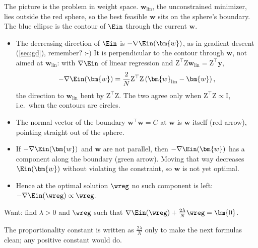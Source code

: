 The picture is the problem in weight space. \(\bm{w}_{\mathrm{lin}}\), the
unconstrained minimizer, lies outside the red sphere, so the best feasible
\(\bm{w}\) sits on the sphere's boundary. The blue ellipse is the contour of
\(\Ein\) through the current \(\bm{w}\).
\begin{itemize}
    \item The decreasing direction of \(\Ein\) is \(-\nabla \Ein(\bm{w})\), as
        in gradient descent (\autoref{sec:gd}), remember? :-)
        It is perpendicular to the contour through \(\bm{w}\), not aimed
        at \(\bm{w}_{\mathrm{lin}}\): with \(\nabla \Ein\) of linear
        regression and \(\mathrm{Z}^\top \mathrm{Z} \bm{w}_{\mathrm{lin}} =
        \mathrm{Z}^\top \bm{y}\),
        \[
            -\nabla \Ein(\bm{w}) = \frac{2}{N} \mathrm{Z}^\top \mathrm{Z}
            \left( \bm{w}_{\mathrm{lin}} - \bm{w} \right) ,
        \]
        the direction to \(\bm{w}_{\mathrm{lin}}\) bent by \(\mathrm{Z}^\top
        \mathrm{Z}\). The two agree only when \(\mathrm{Z}^\top \mathrm{Z}
        \propto \mathrm{I}\), i.e.\ when the contours are circles.
    \item The normal vector of the boundary \(\bm{w}^\top \bm{w} = C\) at
        \(\bm{w}\) is \(\bm{w}\) itself (red arrow), pointing straight out of
        the sphere.
    \item If \(-\nabla \Ein(\bm{w})\) and \(\bm{w}\) are not parallel, then
        \(-\nabla \Ein(\bm{w})\) has a component along the boundary (green
        arrow). Moving that way decreases \(\Ein(\bm{w})\) without violating
        the constraint, so \(\bm{w}\) is not yet optimal.
    \item Hence at the optimal solution \(\wreg\) no such component is left:
        \(-\nabla \Ein(\wreg) \propto \wreg\).
\end{itemize}

\begin{moral}
    Want: find  \(\lambda > 0\) and \(\wreg\) such
    that \(\nabla \Ein(\wreg) + \frac{2\lambda}{N} \wreg = \bm{0}\).
\end{moral}

The proportionality constant is written as \(\frac{2\lambda}{N}\) only to make
the next formulas clean; any positive constant would do.

